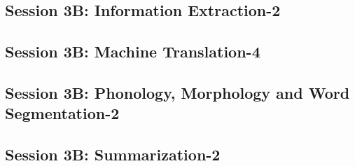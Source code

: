 \subsection{\large Session 3B: Information Extraction-2}
\label{parallel-session-3B-trackD}
\TrackDLoc\hfill\sessionchair{}{}
\clearpage
\subsection{\large Session 3B: Machine Translation-4}
\label{parallel-session-3B-trackE}
\TrackELoc\hfill\sessionchair{}{}
\clearpage
\subsection{\large Session 3B: Phonology, Morphology and Word Segmentation-2}
\label{parallel-session-3B-trackF}
\TrackFLoc\hfill\sessionchair{}{}
\clearpage
\subsection{\large Session 3B: Summarization-2}
\label{parallel-session-3B-trackG}
\TrackGLoc\hfill\sessionchair{}{}
\clearpage


